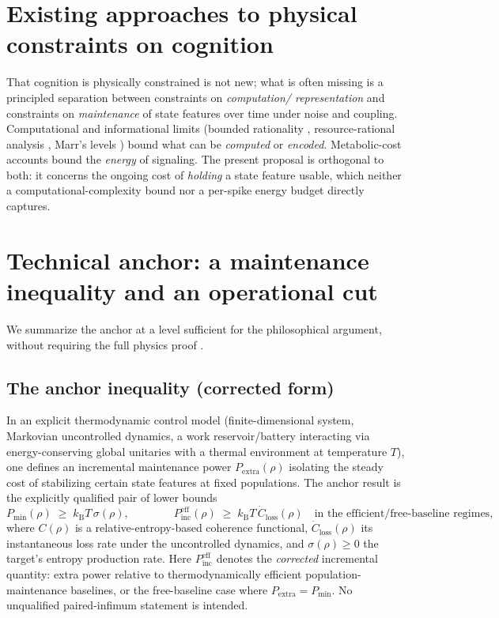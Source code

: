 \documentclass[11pt,a4paper]{article}
\newcommand{\kB}{k_{\mathrm{B}}}
\newcommand{\Pextra}{P_{\mathrm{extra}}}
\newcommand{\Pmin}{P_{\min}}
\newcommand{\Closs}{\dot{C}_{\mathrm{loss}}}
\begin{document}
\section{Existing approaches to physical constraints on cognition}

That cognition is physically constrained is not new; what is often missing is
a principled separation between constraints on \emph{computation/
representation} and constraints on \emph{maintenance} of state features over
time under noise and coupling. Computational and informational limits (bounded
rationality \cite{Simon55}, resource-rational analysis \cite{LiederGriffiths20},
Marr's levels \cite{Marr82}) bound what can be \emph{computed} or
\emph{encoded}. Metabolic-cost accounts \cite{Laughlin98,AttwellLaughlin01}
bound the \emph{energy} of signaling. The present proposal is orthogonal to
both: it concerns the ongoing cost of \emph{holding} a state feature usable,
which neither a computational-complexity bound nor a per-spike energy budget
directly captures.

\section{Technical anchor: a maintenance inequality and an operational cut}

We summarize the anchor at a level sufficient for the philosophical argument,
without requiring the full physics proof \cite{Anchor,Work}.

\subsection{The anchor inequality (corrected form)}

In an explicit thermodynamic control model (finite-dimensional system,
Markovian uncontrolled dynamics, a work reservoir/battery interacting via
energy-conserving global unitaries with a thermal environment at temperature
$T$), one defines an incremental maintenance power $\Pextra(\rho)$ isolating
the steady cost of stabilizing certain state features at fixed populations.
The anchor result is the explicitly qualified pair of lower bounds
\begin{equation}\label{eq:anchor}
\Pmin(\rho) \;\ge\; \kB T\,\sigma(\rho),
\qquad\qquad
P^{\mathrm{eff}}_{\mathrm{inc}}(\rho) \;\ge\; \kB T\,\Closs(\rho)
\quad\text{in the efficient/free-baseline regimes},
\end{equation}
where $C(\rho)$ is a relative-entropy-based coherence functional,
$\Closs(\rho)$ its instantaneous loss rate under the uncontrolled dynamics,
and $\sigma(\rho) \ge 0$ the target's entropy production rate. Here
$P^{\mathrm{eff}}_{\mathrm{inc}}$ denotes the \emph{corrected} incremental
quantity: extra power relative to thermodynamically efficient
population-maintenance baselines, or the free-baseline case where
$\Pextra = \Pmin$. No unqualified paired-infimum statement is intended.
\end{document}
